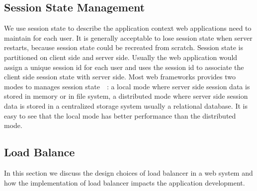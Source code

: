 



\subsection{Session State Management}

We use session state to describe the application context
web applications need to maintain for each user.
It is generally acceptable to lose session state
when server restarts,
because session state could be recreated from scratch.
Session state is partitioned on client side and server side.
Usually the web application would assign a unique 
session id for each user and uses
the session id to associate the client side session state
with server side.
Most web frameworks provides two modes
to manages session state~\cite{j2eedoc}~\cite{phpdoc}:
a local mode where server side session data is stored
in memory or in file system,
a distributed mode where server side session data
is stored in a centralized storage system usually a
relational database.
It is easy to see that the local mode has better performance
than the distributed mode.


\subsection{Load Balance}

In this section we discuss the design choices of load balancer in a web system
and how the implementation of load balancer impacts the application development.

